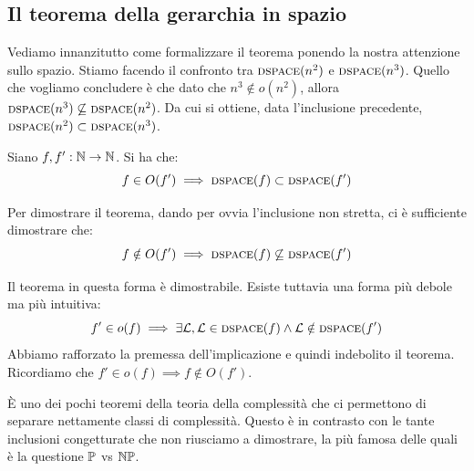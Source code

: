 \subsection{Il teorema della gerarchia in spazio}

Vediamo innanzitutto come formalizzare il teorema ponendo la nostra attenzione sullo spazio.  Stiamo
facendo il confronto tra $\textsc{dspace}(n^{2})$ e $\textsc{dspace}(n^{3})$. Quello che vogliamo concludere è che
dato che $n^{3} \notin o(n^{2})$, allora $\textsc{dspace}(n^{3}) \not\subseteq \textsc{dspace}(n^{2})$. Da cui si
ottiene, data l'inclusione precedente, $\textsc{dspace}(n^{2}) \subset \textsc{dspace}(n^{3})$.

\begin{thm}
    Siano $f,f':\mathbb{N} \to \mathbb{N}$. Si ha che:
    \begin{equation*}
        f \in O(f') \implies \textsc{dspace}(f) \subset \textsc{dspace}(f')
    \end{equation*}
\end{thm}

Per dimostrare il teorema, dando per ovvia l'inclusione non stretta, ci è sufficiente dimostrare
che:
\begin{equation*}
    f \notin O(f') \implies \textsc{dspace}(f) \not\subseteq \textsc{dspace}(f')
\end{equation*}

Il teorema in questa forma è dimostrabile. Esiste tuttavia una forma più debole ma più intuitiva:
\begin{equation*}
    f' \in o(f) \implies \exists \mathcal{L}, \mathcal{L} \in \textsc{dspace}(f) \land \mathcal{L} \notin \textsc{dspace}(f')
\end{equation*}
Abbiamo rafforzato la premessa dell'implicazione e quindi indebolito il teorema. Ricordiamo che $f'
\in o(f) \implies f \notin O(f')$.

È uno dei pochi teoremi della teoria della complessità che ci permettono di separare nettamente
classi di complessità. Questo è in contrasto con le tante inclusioni congetturate che non
riusciamo a dimostrare, la più famosa delle quali è la questione $\mathbb{P}$  vs $\mathbb{NP}$.

